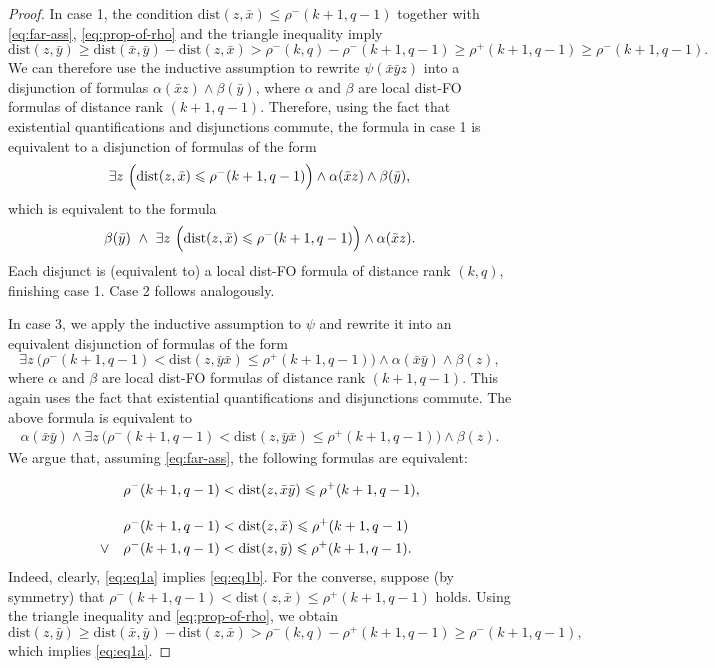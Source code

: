 \documentclass[11pt]{article}
\theoremstyle{remark}
\renewcommand{\le}{\leqslant}
\renewcommand{\ge}{\geqslant}
\newcommand{\dist}{\mathrm{dist}}
\newcommand{\distFO}{\textrm{\upshape dist-FO}\xspace}
\newcommand{\tup}{\bar}
\begin{document}
\begin{proof}
In case 1, the condition
$\dist(z,\tup x)\le \rho^-(k+1,q-1)$
together with \eqref{eq:far-ass}, \eqref{eq:prop-of-rho}
and the triangle inequality imply
$$\dist(z,\tup y)\ge \dist(\tup x,\tup y)-\dist(z,\tup x)> \rho^-(k,q)-\rho^-(k+1,q-1) \ge \rho^+(k+1,q-1) \ge \rho^-(k+1,q-1).$$
 We can therefore use the inductive assumption to rewrite $\psi(\tup x \tup y z)$
 into a disjunction of formulas $\alpha(\tup x z)\land \beta(\tup y)$,
 where $\alpha$ and $\beta$ are local \distFO formulas of distance rank $(k+1,q-1)$.
 Therefore, using the fact that existential quantifications and disjunctions commute,
the formula in case 1
is equivalent to a disjunction of formulas of the form
$$\exists z~
\Bigl(\dist(z,\tup x)\le \rho^-(k+1,q-1)\Bigr)\land \alpha(\tup xz)\land \beta(\tup y),$$
 which is equivalent to the formula
 $$\beta(\tup y)\ \land\  \exists z~ \Bigl(\dist(z,\tup x)\le \rho^-(k+1,q-1)\Bigr)\land \alpha(\tup x z).$$
 Each disjunct is (equivalent to) a local \distFO formula of distance rank $(k,q)$, finishing case 1.
 Case 2 follows analogously.

 In case 3, we apply the inductive assumption to $\psi$
 and rewrite it into an equivalent disjunction of formulas of the form
$$\exists z~\Big(\rho^-(k+1,q-1)<\dist(z,\tup y \tup x)\le \rho^+(k+1,q-1)\Big)\land \alpha(\tup x\tup y)\land \beta(z),$$
where $\alpha$ and $\beta$ are local \distFO formulas of distance rank $(k+1,q-1)$.
This again uses the fact that existential quantifications and disjunctions commute.
The above formula is equivalent to
\begin{align}\label{eq:w}
\alpha(\tup x\tup y)\land
\exists z~\Big(\rho^-(k+1,q-1)<\dist(z,\tup y \tup x)\le \rho^+(k+1,q-1)\Big)\land \beta(z).
\end{align}
We argue that, assuming \eqref{eq:far-ass}, the following formulas are equivalent:

\begin{subequations}\label{eq:eq1}
\begin{align}
  &\rho^-(k+1,q-1)<\dist(z,\tup x\tup y)\le \rho^+(k+1,q-1), \label{eq:eq1a}\\[10pt]
  &\rho^-(k+1,q-1)<\dist(z,\tup x)\le \rho^+(k+1,q-1)  \notag\\
  \lor\quad &\rho^-(k+1,q-1)<\dist(z,\tup y)\le \rho^+(k+1,q-1).
   \label{eq:eq1b}
\end{align}
\end{subequations}
Indeed, clearly, \eqref{eq:eq1a} implies \eqref{eq:eq1b}. For the converse,
    suppose (by symmetry) that
    $\rho^-(k+1,q-1)<\dist(z,\tup x)\le \rho^+(k+1,q-1)$ holds.
    Using the triangle inequality and \eqref{eq:prop-of-rho}, we obtain
    $$\dist(z,\tup y)\ge \dist(\tup x,\tup y)-\dist(z,\tup x)>\rho^-(k,q)-\rho^+(k+1,q-1) \ge \rho^-(k+1,q-1),$$
    which implies \eqref{eq:eq1a}.


\end{proof}
\end{document}
